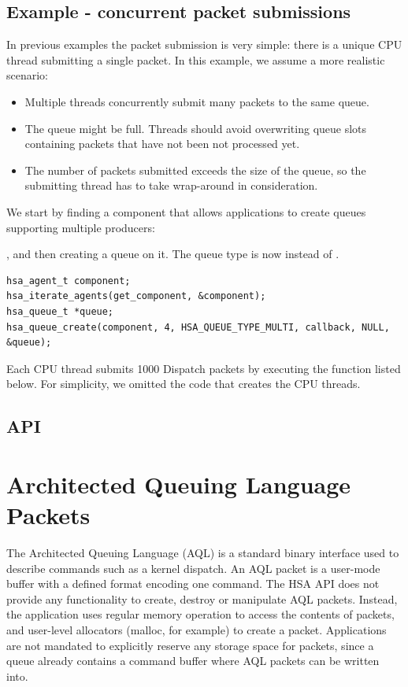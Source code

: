 \documentclass[final]{book}
\begin{document}
\subsection{Example - concurrent packet submissions}
In previous examples the packet submission is very simple: there is a unique CPU
thread submitting a single packet. In this example, we assume a more realistic
scenario:
\begin{itemize}[itemsep=1pt,topsep=3pt,partopsep=0pt]
\item Multiple threads concurrently submit many packets to the same queue.
\item The queue might be full. Threads should avoid overwriting queue slots
  containing packets that have not been not processed yet.
\item The number of packets submitted exceeds the size of the queue, so the
  submitting thread has to take wrap-around in consideration.
\end{itemize}

We start by finding a component that allows applications to create queues
supporting multiple producers:


, and then creating a queue on it. The queue type is now
 instead of .
\begin{lstlisting}
hsa_agent_t component;
hsa_iterate_agents(get_component, &component);
hsa_queue_t *queue;
hsa_queue_create(component, 4, HSA_QUEUE_TYPE_MULTI, callback, NULL, &queue);
\end{lstlisting}
Each CPU thread submits 1000 Dispatch packets by executing the function listed
below. For simplicity, we omitted the code that creates the CPU threads.




\subsection{API}


\section{Architected Queuing Language Packets}\label{sec:aql}
The Architected Queuing Language (AQL) is a standard binary interface used to
describe commands such as a kernel dispatch. An AQL packet is a user-mode buffer
with a defined format encoding one command. The HSA API does not provide any
functionality to create, destroy or manipulate AQL packets. Instead, the
application uses regular memory operation to access the contents of packets, and
user-level allocators (malloc, for example) to create a packet. Applications are
not mandated to explicitly reserve any storage space for packets, since a queue
already contains a command buffer where AQL packets can be written into.
\end{document}
